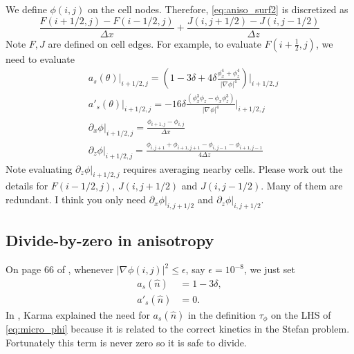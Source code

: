 \documentclass[a4paper,12pt]{article}
\newcommand{\grad}[1]{\nabla_{#1}}
\begin{document}
We define $\phi(i,j)$ on the cell nodes. Therefore, \cref{eq:aniso_surf2} is discretized as
\begin{equation}
\frac{F(i+1/2, j) - F(i-1/2,j)}{\Delta x} + \frac{J(i,j+1/2)-J(i,j-1/2)}{\Delta z}
\end{equation}
Note $F,J$ are defined on cell edges. For example, to evaluate $F(i+\frac{1}{2},j)$, we need to evaluate
\begin{align}
& a_s(\theta) \bigg|_{i+1/2,j} = \left( 1-3\delta + 4\delta  \frac{\phi_x^4 +  \phi_z^4}{|\grad{} \phi|^4} \right)\bigg|_{i+1/2,j} \\
& a'_s(\theta) \bigg|_{i+1/2,j} = -16\delta  \frac{(\phi_x^3 \phi_z- \phi_x \phi_z^3 )}{|\grad{} \phi|^4} \bigg|_{i+1/2,j}\\
& \partial_x \phi \bigg|_{i+1/2,j} = \frac{\phi_{i+1,j}-\phi_{i,j}}{\Delta x} \\
& \partial_z \phi \bigg|_{i+1/2,j}  = \frac{\phi_{i,j+1}+\phi_{i+1,j+1}-\phi_{i,j-1}-\phi_{i+1,j-1}}{4\Delta z} 
\end{align}
Note evaluating $\partial_z \phi |_{i+1/2,j}$ requires averaging nearby cells.  Please work out the details for $F(i-1/2,j)$, $J(i,j+1/2)$ and $J(i,j-1/2)$. Many of them are redundant. I think you only need 
$\partial_x \phi |_{i,j+1/2}$ and $\partial_z \phi |_{i,j+1/2}$.



\subsection{Divide-by-zero in anisotropy}
On page 66 of \cite{Provatas2010}, whenever $|\grad{}\phi(i,j)|^{2} \leq \epsilon $, say $\epsilon = 10^{-8}$, we just set
\begin{align*}
a_s(\hat{n}) &= 1-3\delta, \\
a'_s(\hat{n}) &= 0.
\end{align*}
In \cite{Karma1998}, Karma explained the need for $a_s(\hat{n})$ in the definition $\tau_{\phi}$ on the LHS of \cref{eq:micro_phi} because it is related to the correct kinetics in the Stefan problem. Fortunately this term is never zero so it is safe to divide. 
\end{document}
